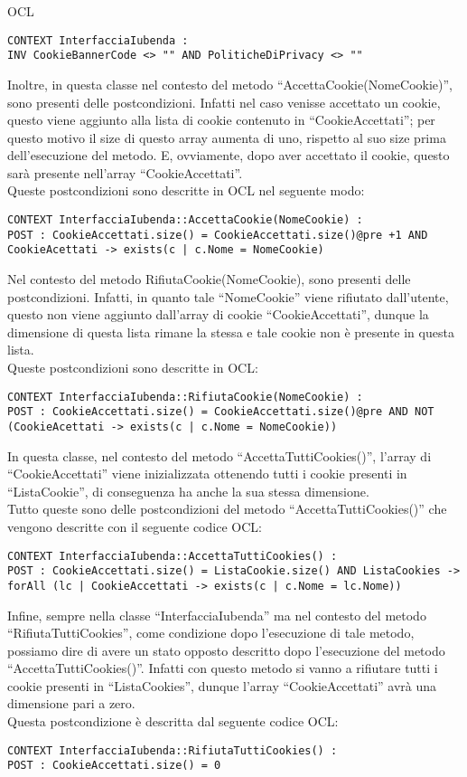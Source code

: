 \begin{listaPersonale}{OCL}
        \begin{lstlisting}
CONTEXT InterfacciaIubenda :
INV CookieBannerCode <> "" AND PoliticheDiPrivacy <> ""
    \end{lstlisting}
        Inoltre, in questa classe nel contesto del metodo “AccettaCookie(NomeCookie)”, sono presenti delle postcondizioni. Infatti nel caso venisse accettato un cookie, questo viene aggiunto alla lista di cookie contenuto in “CookieAccettati”; per questo motivo il size di questo array aumenta di uno, rispetto al suo size prima dell’esecuzione del metodo. E, ovviamente, dopo aver accettato il cookie, questo sarà presente nell’array “CookieAccettati”. \\
        Queste postcondizioni sono descritte in OCL nel seguente modo:
        \begin{lstlisting}
CONTEXT InterfacciaIubenda::AccettaCookie(NomeCookie) :
POST : CookieAccettati.size() = CookieAccettati.size()@pre +1 AND CookieAcettati -> exists(c | c.Nome = NomeCookie)
    \end{lstlisting}
        Nel contesto del metodo RifiutaCookie(NomeCookie), sono presenti delle postcondizioni. Infatti, in quanto tale “NomeCookie” viene rifiutato dall’utente, questo non viene aggiunto dall’array di cookie “CookieAccettati”, dunque la dimensione di questa lista rimane la stessa e tale cookie non è presente in questa lista.\\
        Queste postcondizioni sono descritte in OCL:
        \begin{lstlisting}
CONTEXT InterfacciaIubenda::RifiutaCookie(NomeCookie) :
POST : CookieAccettati.size() = CookieAccettati.size()@pre AND NOT (CookieAcettati -> exists(c | c.Nome = NomeCookie))
    \end{lstlisting}
        In questa classe, nel contesto del metodo “AccettaTuttiCookies()”, l’array di “CookieAccettati” viene inizializzata ottenendo tutti i cookie presenti in “ListaCookie”, di conseguenza ha anche la sua stessa dimensione. \\
        Tutto queste sono delle postcondizioni del metodo “AccettaTuttiCookies()” che vengono descritte con il seguente codice OCL:
        \begin{lstlisting}
CONTEXT InterfacciaIubenda::AccettaTuttiCookies() :
POST : CookieAccettati.size() = ListaCookie.size() AND ListaCookies -> forAll (lc | CookieAccettati -> exists(c | c.Nome = lc.Nome))
    \end{lstlisting}
        Infine, sempre nella classe “InterfacciaIubenda” ma nel contesto del metodo “RifiutaTuttiCookies”, come condizione dopo l’esecuzione di tale metodo, possiamo dire di avere un stato opposto descritto dopo l’esecuzione del metodo “AccettaTuttiCookies()”. Infatti con questo metodo si vanno a rifiutare tutti i cookie presenti in “ListaCookies”, dunque l’array “CookieAccettati” avrà una dimensione pari a zero.\\
        Questa postcondizione è descritta dal seguente codice OCL:
        \begin{lstlisting}
CONTEXT InterfacciaIubenda::RifiutaTuttiCookies() :
POST : CookieAccettati.size() = 0
    \end{lstlisting}





\end{listaPersonale}
